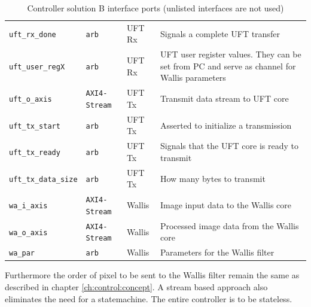 \begin{table}[t!]
\begin{tabular}{l l l p{8cm}}
        \texttt{uft\_rx\_done} & \texttt{arb} & UFT Rx &
        Signals a complete UFT transfer
        \\  
        \texttt{uft\_user\_regX} & \texttt{arb} & UFT Rx &
        UFT user register values. They can be set from PC and serve as channel
        for Wallis parameters
        \\  
        \midrule
        \texttt{uft\_o\_axis} & \texttt{AXI4-Stream} & UFT Tx &
        Transmit data stream to UFT core
        \\
        \texttt{uft\_tx\_start} & \texttt{arb} & UFT Tx &
        Asserted to initialize a transmission
        \\
        \texttt{uft\_tx\_ready} & \texttt{arb} & UFT Tx &
        Signals that the UFT core is ready to transmit
        \\
        \texttt{uft\_tx\_data\_size} & \texttt{arb} & UFT Tx &
        How many bytes to transmit
        \\
        \midrule
        \texttt{wa\_i\_axis} & \texttt{AXI4-Stream} & Wallis &
        Image input data to the Wallis core
        \\
        \texttt{wa\_o\_axis} & \texttt{AXI4-Stream} & Wallis &
        Processed image data from the Wallis core
        \\
        \texttt{wa\_par} & \texttt{arb} & Wallis &
        Parameters for the Wallis filter
        \\
        \bottomrule
    \end{tabular}
    \caption{Controller solution B interface ports (unlisted interfaces
    are not used)}
    \label{tab:controllerbports}
\end{table}

Furthermore the order of pixel to be sent to the Wallis filter remain the same
as described in chapter \ref{ch:control:concept}. A stream based approach also eliminates the need for a statemachine. The entire
controller is to be stateless.

